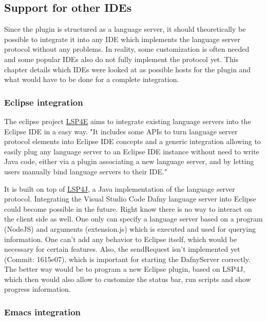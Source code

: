 \subsection{Support for other IDEs} \label{ides}
Since the plugin is structured as a language server, it should theoretically be possible to integrate it into any IDE which implements the language server protocol without any problems. In reality, some customization is often needed and some popular IDEs also do not fully implement the protocol yet. This chapter details which IDEs were looked at as possible hosts for the plugin and what would have to be done for a complete integration.

\subsubsection{Eclipse integration}
The eclipse project \href{https://projects.eclipse.org/projects/technology.lsp4e}{LSP4E} aims to integrate existing language servers into the Eclipse IDE in a easy way. 
\newline
"It includes some APIs to turn language server protocol elements into Eclipse IDE concepts and a generic integration allowing to easily plug any language server to an Eclipse IDE instance without need to write Java code, either via a plugin associating a new language server, and by letting users manually bind language servers to their IDE." \cite{lsp4e}

It is built on top of \href{https://github.com/eclipse/lsp4j}{LSP4J}, a Java implementation of the language server protocol. 
\newline
Integrating the Visual Studio Code Dafny language server into Eclipse could become possible in the future. Right know there is no way to interact on the client side as well. One only can specify a language server based on a program (NodeJS) and arguments (extension.js) which is executed and used for querying information. One can't add any behavior to Eclipse itself, which would be necessary for certain features. Also, the sendRequest isn't implemented yet (Commit: 1615e07), which is important for starting the DafnyServer correctly. 
The better way would be to program a new Eclipse plugin, based on LSP4J, which then would also allow to customize the status bar, run scripts and show progress information. 


\subsubsection{Emacs integration}

